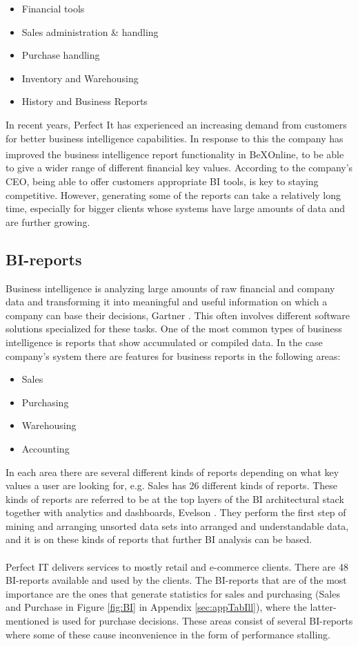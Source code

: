 \documentclass{cslthse-msc}
\newcommand{\bex}{BeX\textsuperscript{\textregistered}}
\begin{document}
\begin{itemize}
\item Financial tools
\item Sales administration \& handling
\item Purchase handling
\item Inventory and Warehousing
\item History and Business Reports
\end{itemize}

\noindent In recent years, Perfect It has experienced an increasing demand from customers for better business intelligence capabilities. In response to this the company has improved the business intelligence report functionality in \bex Online, to be able to give a wider range of different financial key values. According to the company's CEO, being able to offer customers appropriate BI tools, is key to staying competitive. However, generating some of the reports can take a relatively long time, especially for bigger clients whose systems have large amounts of data and are further growing.

\subsection{BI-reports}\label{sec:BI}
Business intelligence is analyzing large amounts of raw financial and company data and transforming it into meaningful and useful information on which a company can base their decisions, Gartner  \cite{bintelligence}. This often involves different software solutions specialized for these tasks. One of the most common types of business intelligence is reports that show accumulated or compiled data. In the case company's system there are features for business reports in the following areas:

\begin{itemize}
\item Sales
\item Purchasing
\item Warehousing
\item Accounting
\end{itemize}

\noindent In each area there are several different kinds of reports depending on what key values a user are looking for, e.g. Sales has 26 different kinds of reports. These kinds of reports are referred to be at the top layers of the BI architectural stack together with analytics and dashboards, Evelson \cite{Evelson10}. They perform the first step of mining and arranging unsorted data sets into arranged and understandable data, and it is on these kinds of reports that further BI analysis can be based.\\\\
Perfect IT delivers services to mostly retail and e-commerce clients. There are 48 BI-reports available and used by the clients. The BI-reports that are of the most importance are the ones that generate statistics for sales and purchasing (Sales and Purchase in Figure \ref{fig:BI} in Appendix \ref{sec:appTabIll}), where the latter-mentioned is used for purchase decisions. These areas consist of several BI-reports where some of these cause inconvenience in the form of performance stalling. 
\end{document}
